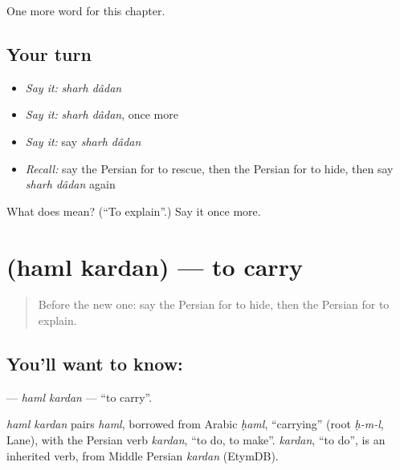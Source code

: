 \begin{grammarlens}[title={What you've built}]
One more word for this chapter.
\end{grammarlens}

\subsection*{Your turn}
\begin{itemize}
\raggedright
  \item \emph{Say it:} \emph{sharh dâdan}
  \item \emph{Say it:} \emph{sharh dâdan}, once more
  \item \emph{Say it:} say \emph{sharh dâdan}
  \item \emph{Recall:} say the Persian for to rescue, then the Persian for to hide, then say \emph{sharh dâdan} again
\end{itemize}

\begin{tcolorbox}[breakable,colback=teal!4,colframe=teal!35!black,title={Before you move on}]
What does   mean? (\textquotedblleft{}To explain\textquotedblright{}.) Say it once more.
\end{tcolorbox}
\section[\texorpdfstring{\fa{حمل} \fa{کردن} (haml kardan)}{حمل کردن (haml kardan)}]{  (haml kardan) — to carry}

\label{lesson:FA-C223-haml-kardan}



\begin{quote}
Before the new one: say the Persian for to hide, then the Persian for to explain.
\end{quote}

\subsection*{You'll want to know:  }
\textbf{ } — \emph{haml kardan} — \textquotedblleft{}to carry\textquotedblright{}.

\begin{cousinweb}
\emph{haml kardan} pairs \emph{haml}, borrowed from Arabic \emph{ḥaml}, \textquotedblleft{}carrying\textquotedblright{} (root \emph{ḥ-m-l}, Lane), with the Persian verb \emph{kardan}, \textquotedblleft{}to do, to make\textquotedblright{}. \emph{kardan}, \textquotedblleft{}to do\textquotedblright{}, is an inherited verb, from Middle Persian \emph{kardan} (EtymDB).
\end{cousinweb}

